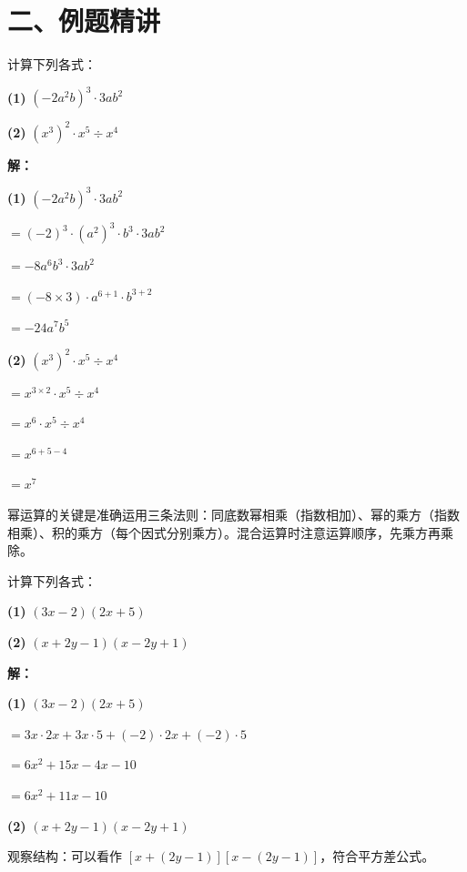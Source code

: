 \documentclass[12pt, a4paper]{ctexart}
\begin{document}
\section*{\textcolor{examorange}{二、例题精讲}}

\begin{examplebox}
计算下列各式：

\textbf{(1)} $(-2a^2b)^3 \cdot 3ab^2$

\textbf{(2)} $(x^3)^2 \cdot x^5 \div x^4$
\end{examplebox}

\textbf{解：}

\textbf{(1)} $(-2a^2b)^3 \cdot 3ab^2$

$= (-2)^3 \cdot (a^2)^3 \cdot b^3 \cdot 3ab^2$

$= -8a^6b^3 \cdot 3ab^2$

$= (-8 \times 3) \cdot a^{6+1} \cdot b^{3+2}$

$= -24a^7b^5$

\medskip
\textbf{(2)} $(x^3)^2 \cdot x^5 \div x^4$

$= x^{3 \times 2} \cdot x^5 \div x^4$

$= x^6 \cdot x^5 \div x^4$

$= x^{6+5-4}$

$= x^7$

\begin{tipbox}[方法总结]
幂运算的关键是准确运用三条法则：同底数幂相乘（指数相加）、幂的乘方（指数相乘）、积的乘方（每个因式分别乘方）。混合运算时注意运算顺序，先乘方再乘除。
\end{tipbox}

\begin{examplebox}
计算下列各式：

\textbf{(1)} $(3x - 2)(2x + 5)$

\textbf{(2)} $(x + 2y - 1)(x - 2y + 1)$
\end{examplebox}

\textbf{解：}

\textbf{(1)} $(3x - 2)(2x + 5)$

$= 3x \cdot 2x + 3x \cdot 5 + (-2) \cdot 2x + (-2) \cdot 5$

$= 6x^2 + 15x - 4x - 10$

$= 6x^2 + 11x - 10$

\medskip
\textbf{(2)} $(x + 2y - 1)(x - 2y + 1)$

观察结构：可以看作 $[x + (2y - 1)][x - (2y - 1)]$，符合平方差公式。
\end{document}
